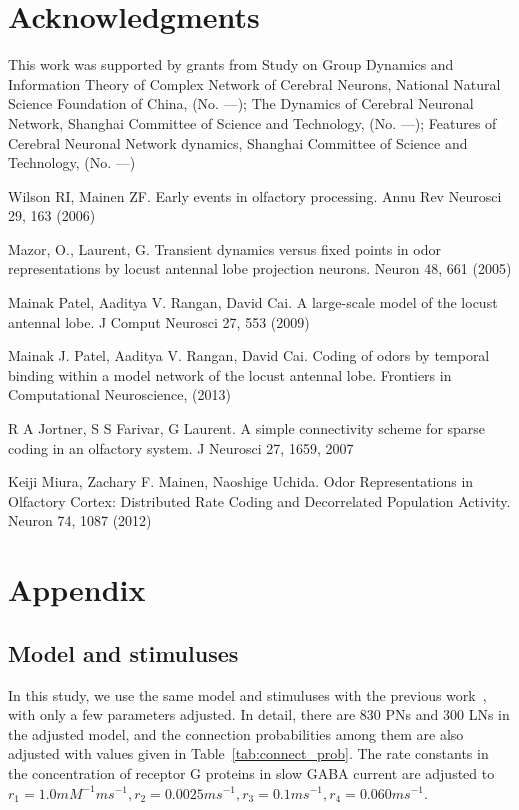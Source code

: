 \documentclass[12pt, a4paper]{article}
\begin{document}
\section*{Acknowledgments}
This work was supported by grants from Study on Group Dynamics and Information Theory of Complex Network of Cerebral Neurons, National Natural Science Foundation of China, (No. ---); The Dynamics of Cerebral Neuronal Network, Shanghai Committee of Science and Technology, (No. ---); Features of Cerebral Neuronal Network dynamics, Shanghai Committee of Science and Technology, (No. ---) \cdots

\begin{thebibliography}{99} \scriptsize

Wilson RI, Mainen ZF. Early events in olfactory processing. Annu Rev Neurosci 29, 163 (2006)

Mazor, O., Laurent, G. Transient dynamics versus fixed points in odor representations by locust antennal lobe projection neurons. Neuron 48, 661 (2005)

Mainak Patel, Aaditya V. Rangan, David Cai. A large-scale model of the locust antennal lobe. J Comput Neurosci 27, 553 (2009)

Mainak J. Patel, Aaditya V. Rangan, David Cai. Coding of odors by temporal binding within a model network of the locust antennal lobe. Frontiers in Computational Neuroscience, (2013)

R A Jortner, S S Farivar, G Laurent. A simple connectivity scheme for sparse coding in an olfactory system. J Neurosci 27, 1659, 2007

Keiji Miura, Zachary F. Mainen, Naoshige Uchida. Odor Representations in Olfactory Cortex: Distributed Rate Coding and Decorrelated Population Activity. Neuron 74, 1087 (2012)

\end{thebibliography}

\section*{Appendix} \label{Sect:appendix}
\subsection*{Model and stimuluses} \label{Sect:model}
In this study, we use the same model and stimuluses with the previous work~\citep{}, with only a few parameters adjusted. In detail, there are 830 PNs and 300 LNs in the adjusted model, and the connection probabilities among them are also adjusted with values given in Table~\ref{tab:connect_prob}. The rate constants in the concentration of receptor G proteins in slow GABA current are adjusted to $r_1 = 1.0 mM^{-1}ms^{-1}, r_2 = 0.0025 ms^{-1}, r_3 = 0.1 ms^{-1}, r_4 = 0.060 ms^{-1}$.
\end{document}

